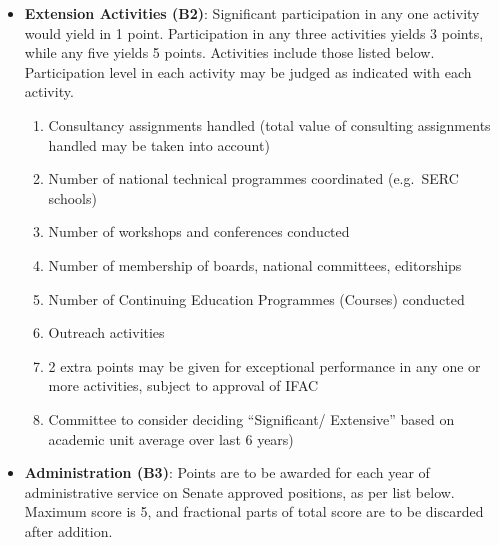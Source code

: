 \documentclass[
  10pt,
  a5paper,
  10pt,
  openany]{amsbook}
\providecommand{\tightlist}{%
  \setlength{\itemsep}{0pt}\setlength{\parskip}{0pt}}
\begin{document}
\begin{itemize}
  \begin{enumerate}
  \def\labelenumi{\arabic{enumi}.}
  \tightlist
  \item
    Information about projects and funding are to be taken from IRCC
    online records
  \item
    For multi-investigative projects, fractional share of a professor
    should be as per share declared in IRCC.
  \item
    For large departmental projects such as FIST, IRHPA etc., the
    academic unit's committee to consider contributions while
    apportioning credit.
  \item
    A transferred technology = 1 sponsored project
  \item
    Number/scope of projects and/or funding initiated in the assessment
    period may be taken into account when comparing with academic unit
    average
  \item
    Count of projects and funding as per IRCC.
  \item
    2 extra points (subject to maximum total of 5) may be awarded for
    exceptional achievements in sponsored research projects, subject to
    approval of IFAC.
  \end{enumerate}
\item
  \textbf{Extension Activities (B2)}: Significant participation in any
  one activity would yield in 1 point. Participation in any three
  activities yields 3 points, while any five yields 5 points. Activities
  include those listed below. Participation level in each activity may
  be judged as indicated with each activity.

  \begin{enumerate}
  \def\labelenumi{\arabic{enumi}.}
  \tightlist
  \item
    Consultancy assignments handled (total value of consulting
    assignments handled may be taken into account)
  \item
    Number of national technical programmes coordinated (e.g.~SERC
    schools)
  \item
    Number of workshops and conferences conducted
  \item
    Number of membership of boards, national committees, editorships
  \item
    Number of Continuing Education Programmes (Courses) conducted
  \item
    Outreach activities
  \item
    2 extra points may be given for exceptional performance in any one
    or more activities, subject to approval of IFAC
  \item
    Committee to consider deciding ``Significant/ Extensive'' based on
    academic unit average over last 6 years)
  \end{enumerate}
\item
  \textbf{Administration (B3)}: Points are to be awarded for each year
  of administrative service on Senate approved positions, as per list
  below. Maximum score is 5, and fractional parts of total score are to
  be discarded after addition.


\end{itemize}
\end{document}
